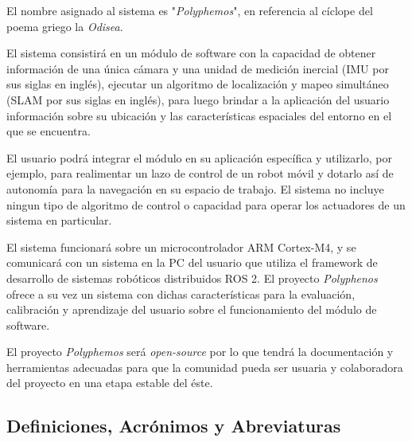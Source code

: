 \documentclass[12pt,a4paper, twosite]{article}
\begin{document}
El nombre asignado al sistema es "\textit{Polyphemos}", en referencia al cíclope del poema
griego la \textit{Odisea}. 

El sistema consistirá en un módulo de software con la capacidad de obtener información de una única
cámara y una unidad de medición inercial (IMU por sus siglas en inglés), ejecutar un algoritmo de
localización y mapeo simultáneo (SLAM por sus siglas en inglés), para luego brindar a la aplicación
del usuario información sobre su ubicación y las características espaciales del entorno en el que se
encuentra.

El usuario podrá integrar el módulo en su aplicación específica y utilizarlo, por ejemplo, para
realimentar un lazo de control de un robot móvil y dotarlo así de autonomía para la navegación en su
espacio de trabajo. El sistema no incluye ningun tipo de algoritmo de control o capacidad para
operar los actuadores de un sistema en particular.

El sistema funcionará sobre un microcontrolador ARM Cortex-M4, y se comunicará con un sistema en la
PC del usuario que utiliza el framework de desarrollo de sistemas robóticos distribuidos ROS 2.
El proyecto \textit{Polyphenos} ofrece a su vez un sistema con dichas características para la
evaluación, calibración y aprendizaje del usuario sobre el funcionamiento del módulo de software.

El proyecto \textit{Polyphemos} será \textit{open-source} por lo que tendrá la documentación
y herramientas adecuadas para que la comunidad pueda ser usuaria y colaboradora del proyecto en una
etapa estable del éste.

\subsection{Definiciones, Acrónimos y Abreviaturas}
\label{sec:orgb158e36}

\end{document}
